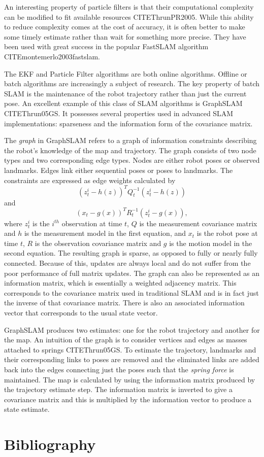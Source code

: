 \documentclass[12pt]{report}
\begin{document}
An interesting property of particle filters is that their computational complexity can be modified to fit available resources CITE{ThrunPR2005}.  While this ability to reduce complexity comes at the cost of accuracy, it is often better to make some timely estimate rather than wait for something more precise.  They have been used with great success in the popular FastSLAM algorithm CITE{montemerlo2003fastslam}.

The EKF and Particle Filter algorithms are both online algorithms.  Offline or batch algorithms are increasingly a subject of research.  The key property of batch SLAM is the maintenance of the robot trajectory rather than just the current pose.   An excellent example of this class of SLAM algorithms is GraphSLAM CITE{Thrun05GS}.  It possesses several properties used in advanced SLAM implementations: sparseness and the information form of the covariance matrix.

The \emph{graph} in GraphSLAM refers to a graph of information constraints describing the robot's knowledge of the map and trajectory.  The graph consists of two node types and two corresponding edge types.  Nodes are either robot poses or observed landmarks.  Edges link either sequential poses or poses to landmarks.  The constraints are expressed as edge weights calculated by 
\begin{equation}\label{constraint1}
(z_{t}^{i} - h(z))^TQ_{t}^{-1}(z_{t}^{i} - h(z)) 
\end{equation}
and 
\begin{equation}\label{constraint2}
(x_{t} - g(x))^TR_{t}^{-1}(z_{t}^{i} - g(x)),
\end{equation}
 where $z_t^i$ is the $i^{th}$ observation at time $t$, $Q$ is the measurement covariance matrix and $h$ is the measurement model in the first equation, and $x_{t}$ is the robot pose at time $t$, $R$ is the observation covariance matrix and $g$ is the motion model in the second equation.  The resulting graph is sparse, as opposed to fully or nearly fully connected.  Because of this, updates are always local and do not suffer from the poor performance of full matrix updates.  The graph can also be represented as an information matrix, which is essentially a weighted adjacency matrix.  This corresponds to the covariance matrix used in traditional SLAM and is in fact just the inverse of that covariance matrix.  There is also an associated information vector that corresponds to the usual state vector.  

GraphSLAM produces two estimates: one for the robot trajectory and another for the map.  An intuition of the graph is to consider vertices and edges as masses attached to springs CITE{Thrun05GS}.  To estimate the trajectory, landmarks and their corresponding links to poses are removed and the eliminated links are added back into the edges connecting just the poses such that the \emph{spring force} is maintained.  The map is calculated by using the information matrix produced by the trajectory estimate step.  The information matrix is inverted to give a covariance matrix and this is multiplied by the information vector to produce a state estimate.  


\chapter{Bibliography}

{}
\end{document}
